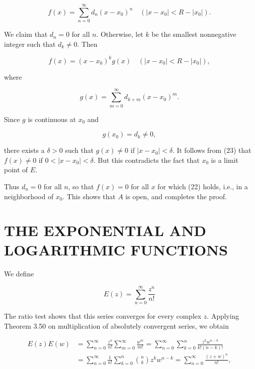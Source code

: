 \documentclass[10pt]{article}
\begin{document}
\begin{equation*}
f(x)=\sum_{n=0}^{\infty} d_{n}\left(x-x_{0}\right)^{n} \quad\left(\left|x-x_{0}\right|<R-\left|x_{0}\right|\right) . \tag{22}
\end{equation*}


We claim that $d_{n}=0$ for all $n$. Otherwise, let $k$ be the smallest nonnegative integer such that $d_{k} \neq 0$. Then


\begin{equation*}
f(x)=\left(x-x_{0}\right)^{k} g(x) \quad\left(\left|x-x_{0}\right|<R-\left|x_{0}\right|\right), \tag{23}
\end{equation*}


where


\begin{equation*}
g(x)=\sum_{m=0}^{\infty} d_{k+m}\left(x-x_{0}\right)^{m} . \tag{24}
\end{equation*}


Since $g$ is continuous at $x_{0}$ and

$$
g\left(x_{0}\right)=d_{k} \neq 0,
$$

there exists a $\delta>0$ such that $g(x) \neq 0$ if $\left|x-x_{0}\right|<\delta$. It follows from (23) that $f(x) \neq 0$ if $0<\left|x-x_{0}\right|<\delta$. But this contradicts the fact that $x_{0}$ is a limit point of $E$.

Thus $d_{n}=0$ for all $n$, so that $f(x)=0$ for all $x$ for which (22) holds, i.e., in a neighborhood of $x_{0}$. This shows that $A$ is open, and completes the proof.

\section*{THE EXPONENTIAL AND LOGARITHMIC FUNCTIONS}
We define


\begin{equation*}
E(z)=\sum_{n=0}^{\infty} \frac{z^{n}}{n!} \tag{25}
\end{equation*}


The ratio test shows that this series converges for every complex $z$. Applying Theorem 3.50 on multiplication of absolutely convergent series, we obtain

$$
\begin{aligned}
E(z) E(w) & =\sum_{n=0}^{\infty} \frac{z^{n}}{n!} \sum_{m=0}^{\infty} \frac{w^{m}}{m!}=\sum_{n=0}^{\infty} \sum_{k=0}^{n} \frac{z^{k} w^{n-k}}{k!(n-k)!} \\
& =\sum_{n=0}^{\infty} \frac{1}{n!} \sum_{k=0}^{n}\binom{n}{k} z^{k} w^{n-k}=\sum_{n=0}^{\infty} \frac{(z+w)^{n}}{n!},
\end{aligned}
$$
\end{document}
